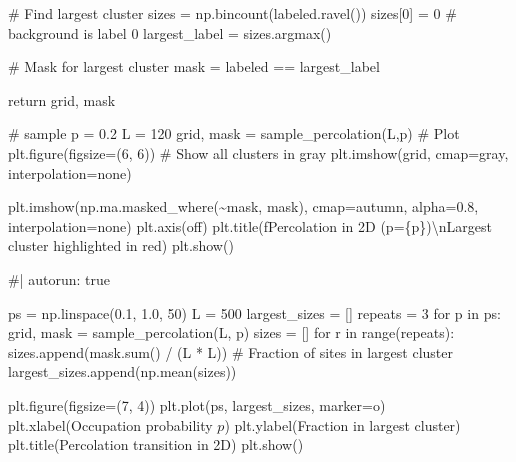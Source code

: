 \documentclass[
  letterpaper,
  enabledeprecatedfontcommands]{report}
\newenvironment{Shaded}{\begin{snugshade}}{\end{snugshade}}
\newcommand{\NormalTok}[1]{\textcolor[rgb]{0.00,0.23,0.31}{#1}}
\begin{document}
\begin{tcolorbox}
\begin{Shaded}
\begin{Highlighting}[]
\NormalTok{    \# Find largest cluster}
\NormalTok{    sizes = np.bincount(labeled.ravel())}
\NormalTok{    sizes[0] = 0  \# background is label 0}
\NormalTok{    largest\_label = sizes.argmax()}
    
\NormalTok{    \# Mask for largest cluster}
\NormalTok{    mask = labeled == largest\_label}

\NormalTok{    return grid, mask}

\NormalTok{\# sample}
\NormalTok{p = 0.2}
\NormalTok{L = 120}
\NormalTok{grid, mask = sample\_percolation(L,p)}
\NormalTok{\# Plot}
\NormalTok{plt.figure(figsize=(6, 6))}
\NormalTok{\# Show all clusters in gray}
\NormalTok{plt.imshow(grid, cmap=\textquotesingle{}gray\textquotesingle{}, interpolation=\textquotesingle{}none\textquotesingle{})}

\NormalTok{plt.imshow(np.ma.masked\_where(\textasciitilde{}mask, mask), cmap=\textquotesingle{}autumn\textquotesingle{}, alpha=0.8, interpolation=\textquotesingle{}none\textquotesingle{})}
\NormalTok{plt.axis(\textquotesingle{}off\textquotesingle{})}
\NormalTok{plt.title(f\textquotesingle{}Percolation in 2D (p=\{p\})\textbackslash{}nLargest cluster highlighted in red\textquotesingle{})}
\NormalTok{plt.show()}
\end{Highlighting}
\end{Shaded}

\begin{Shaded}
\begin{Highlighting}[]
\NormalTok{\#| autorun: true }

\NormalTok{ps = np.linspace(0.1, 1.0, 50)}
\NormalTok{L = 500}
\NormalTok{largest\_sizes = []}
\NormalTok{repeats = 3}
\NormalTok{for p in ps:}
\NormalTok{    grid, mask = sample\_percolation(L, p)}
\NormalTok{    sizes = []}
\NormalTok{    for r in range(repeats):}
\NormalTok{        sizes.append(mask.sum() / (L * L))  \# Fraction of sites in largest cluster}
\NormalTok{    largest\_sizes.append(np.mean(sizes))}

\NormalTok{plt.figure(figsize=(7, 4))}
\NormalTok{plt.plot(ps, largest\_sizes, marker=\textquotesingle{}o\textquotesingle{})}
\NormalTok{plt.xlabel(\textquotesingle{}Occupation probability $p$\textquotesingle{})}
\NormalTok{plt.ylabel(\textquotesingle{}Fraction in largest cluster\textquotesingle{})}
\NormalTok{plt.title(\textquotesingle{}Percolation transition in 2D\textquotesingle{})}
\NormalTok{plt.show()}
\end{Highlighting}
\end{Shaded}


\end{tcolorbox}
\end{document}
